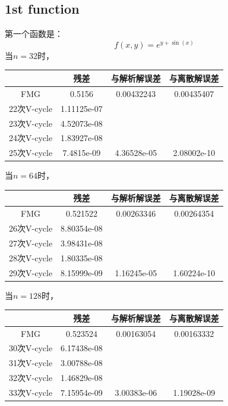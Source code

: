 \documentclass[a4paper,11.5pt,UTF8]{ctexart}
\begin{document}
\begin{large}
\subsection{1st function}
\par 第一个函数是：$$f(x,y)=e^{y+\sin(x)}$$
当$n=32$时，
\begin{center}
	\begin{tabular}{|c|c|c|c|}
		\hline
		& 残差 & 与解析解误差 & 与离散解误差 \\
		\hline
		FMG & 0.5156 & 0.00432243 & 0.00435407 \\
		\hline
		22次V-cycle & 1.11125e-07 & ~ & ~ \\
		\hline
		23次V-cycle & 4.52073e-08 & ~ & ~ \\
		\hline
		24次V-cycle & 1.83927e-08 & ~ & ~ \\
		\hline
		25次V-cycle & 7.4815e-09 & 4.36528e-05 & 2.08002e-10 \\
		\hline
	\end{tabular}
\end{center}
当$n=64$时，
\begin{center}
	\begin{tabular}{|c|c|c|c|}
		\hline
		& 残差 & 与解析解误差 & 与离散解误差 \\
		\hline
		FMG & 0.521522 & 0.00263346 & 0.00264354 \\
		\hline
		26次V-cycle & 8.80354e-08 & ~ & ~ \\
		\hline
		27次V-cycle & 3.98431e-08 & ~ & ~ \\
		\hline
		28次V-cycle & 1.80335e-08 & ~ & ~ \\
		\hline
		29次V-cycle & 8.15999e-09 & 1.16245e-05 & 1.60224e-10 \\
		\hline
	\end{tabular}
\end{center}
当$n=128$时，
\begin{center}
	\begin{tabular}{|c|c|c|c|}
		\hline
		& 残差 & 与解析解误差 & 与离散解误差 \\
		\hline
		FMG & 0.523524 & 0.00163054 & 0.00163332 \\
		\hline
		30次V-cycle & 6.17438e-08 & ~ & ~ \\
		\hline
		31次V-cycle & 3.00788e-08 & ~ & ~ \\
		\hline
		32次V-cycle & 1.46829e-08 & ~ & ~ \\
		\hline
		33次V-cycle & 7.15954e-09 & 3.00383e-06 & 1.19028e-09 \\
		\hline
	\end{tabular}

\end{center}
\end{large}
\end{document}
